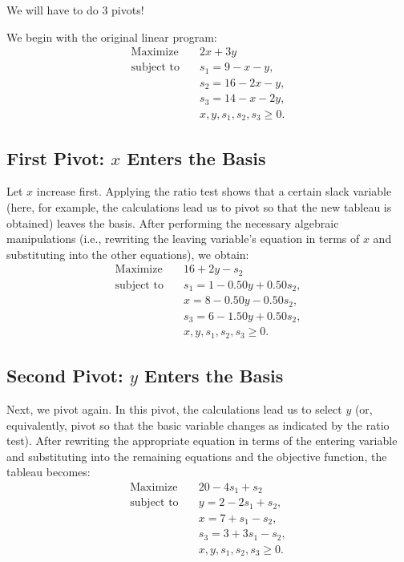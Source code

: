 \begin{solution}
We will have to do 3 pivots!



We begin with the original linear program:
\[
\begin{aligned}
\text{Maximize}\quad & 2x + 3y \\
\text{subject to}\quad & s_1 = 9 - x - y, \\
                        & s_2 = 16 - 2x - y, \\
                        & s_3 = 14 - x - 2y, \\
                        & x, y, s_1, s_2, s_3 \ge 0.
\end{aligned}
\]

\subsection*{First Pivot: \(x\) Enters the Basis}

Let \(x\) increase first. Applying the ratio test shows that a certain slack variable (here, for example, the calculations lead us to pivot so that the new tableau is obtained) leaves the basis. After performing the necessary algebraic manipulations (i.e., rewriting the leaving variable’s equation in terms of \(x\) and substituting into the other equations), we obtain:
\[
\begin{aligned}
\text{Maximize}\quad & 16 + 2y - s_2 \\
\text{subject to}\quad & s_1 = 1 - 0.50y + 0.50s_2, \\
                        & x = 8 - 0.50y - 0.50s_2, \\
                        & s_3 = 6 - 1.50y + 0.50s_2, \\
                        & x, y, s_1, s_2, s_3 \ge 0.
\end{aligned}
\]

\subsection*{Second Pivot: \(y\) Enters the Basis}

Next, we pivot again. In this pivot, the calculations lead us to select \(y\) (or, equivalently, pivot so that the basic variable changes as indicated by the ratio test). After rewriting the appropriate equation in terms of the entering variable and substituting into the remaining equations and the objective function, the tableau becomes:
\[
\begin{aligned}
\text{Maximize}\quad & 20 - 4s_1 + s_2 \\
\text{subject to}\quad & y = 2 - 2s_1 + s_2, \\
                        & x = 7 + s_1 - s_2, \\
                        & s_3 = 3 + 3s_1 - s_2, \\
                        & x, y, s_1, s_2, s_3 \ge 0.
\end{aligned}
\]

\end{solution}
